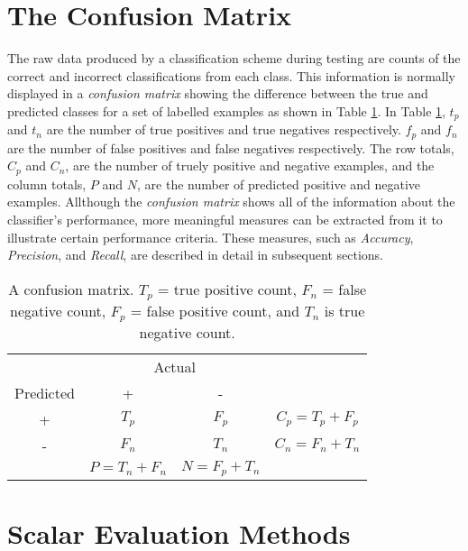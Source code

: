 \documentclass[10pt]{unbthesis}
\begin{document}
\section*{The Confusion Matrix}
The raw data produced by a classification scheme during testing are
counts of the correct and incorrect classifications from each
class. This information is normally displayed in a \textit{confusion
  matrix} showing the difference between the true and predicted
classes for a set of labelled examples as shown in Table
\ref{tab:confusionmatrix}. In Table \ref{tab:confusionmatrix}, \(t_p\)
and \(t_n\) are the number of true positives and true negatives
respectively. \(f_p\) and \(f_n\) are the number of false positives
and false negatives respectively. The row totals, \(C_p\) and \(C_n\),
are the number of truely positive and negative examples, and the
column totals, \(P\) and \(N\), are the number of predicted positive
and negative examples. Allthough the \textit{confusion matrix} shows
all of the information about the classifier's performance, more
meaningful measures can be extracted from it to illustrate certain
performance criteria. These measures, such as \textit{Accuracy},
\textit{Precision}, and \textit{Recall}, are described in detail in
subsequent sections.

\begin{table}
\centering
  \begin{tabular}{c|c|c|c}
    & \multicolumn{2}{|c|}{Actual} \\ \cline{1-3}
    Predicted & + & - & \\ \hline
    + & \(T_p\)           & \(F_p\)           & \(C_p = T_p + F_p\)  \\ \hline
    - & \(F_n\)           & \(T_n\)           & \(C_n = F_n + T_n\)  \\ \hline
    & \(P = T_n + F_n\) & \(N = F_p + T_n\) \\ \cline{2-3}
  \end{tabular}
  \caption{A confusion matrix. \(T_p\) = true positive count, \(F_n\)
  = false negative count, \(F_p\) = false positive count, and \(T_n\)
  is true negative count.}
  \label{tab:confusionmatrix}
\end{table}


\section*{Scalar Evaluation Methods}
\end{document}
